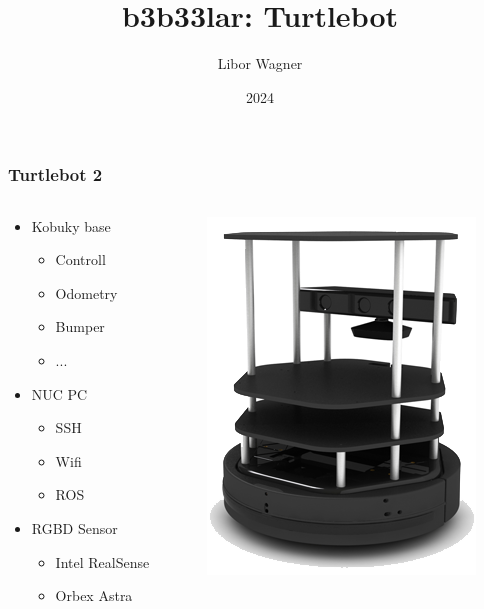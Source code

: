 \documentclass{beamer}
\title{b3b33lar: Turtlebot}
\author{Libor Wagner}
\date{2024}
\begin{document}
\frame{\titlepage}

\begin{frame}
  \frametitle{Turtlebot 2}
  \begin{columns}
    \begin{column}{0.5\textwidth}
      \begin{itemize}
      \item Kobuky base
        \begin{itemize}
        \item Controll
        \item Odometry
        \item Bumper
        \item ...
        \end{itemize}
      \item NUC PC
        \begin{itemize}
        \item SSH
        \item Wifi
        \item ROS
        \end{itemize}
      \item RGBD Sensor
        \begin{itemize}
        \item Intel RealSense
        \item Orbex Astra
        \end{itemize}
      \end{itemize}
    \end{column}
    \begin{column}{0.5\textwidth}
      \begin{center}
        \includegraphics[]{fig/turtlebot_2}
      \end{center}
    \end{column}
  \end{columns}
\end{frame}
\end{document}

